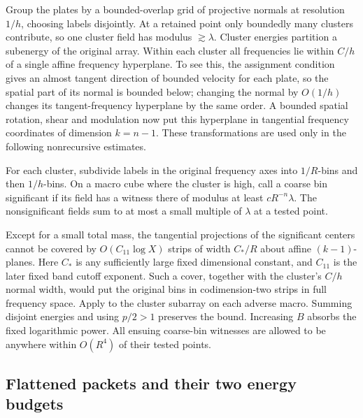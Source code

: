 Group the plates by a bounded-overlap grid of projective normals at
resolution $1/h$, choosing labels disjointly.  At a retained point only
boundedly many clusters contribute, so one cluster field has modulus
$\gtrsim\lambda$.  Cluster energies partition a subenergy of the
original array.  Within each cluster all frequencies lie within $C/h$
of a single affine frequency hyperplane.  To see this, the assignment
condition gives an almost tangent direction of bounded velocity for
each plate, so the spatial part of its normal is bounded below; changing
the normal by $O(1/h)$ changes its tangent-frequency hyperplane by the
same order.  A bounded spatial rotation, shear and modulation now put
this hyperplane in tangential frequency coordinates of dimension
$k=n-1$.  These transformations are used only in the following
nonrecursive estimates.

For each cluster, subdivide labels in the original frequency axes into
$1/R$-bins and then $1/h$-bins.  On a macro cube where the cluster is
high, call a coarse bin significant if its field has a witness there
of modulus at least $cR^{-n}\lambda$.  The nonsignificant fields sum
to at most a small multiple of $\lambda$ at a tested point.

Except for a small total mass, the tangential projections of the
significant centers cannot be covered by $O(C_{11}\log X)$ strips of
width $C_*/R$ about affine $(k-1)$-planes.  Here $C_*$ is any sufficiently
large fixed dimensional constant, and $C_{11}$ is the later fixed band
cutoff exponent.  Such a cover, together with the cluster's $C/h$
normal width, would put the original bins in codimension-two strips
in full frequency space.  Apply  to the cluster subarray
on each adverse macro.  Summing disjoint energies and using $p/2>1$
preserves the bound.  Increasing $B$ absorbs the fixed logarithmic
power.  All ensuing coarse-bin witnesses are allowed to be anywhere
within $O(R^4)$ of their tested points.

\subsection{Flattened packets and their two energy budgets}

